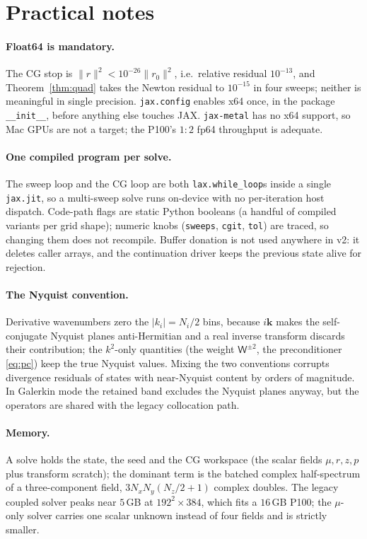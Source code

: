 \documentclass[11pt]{article}
\theoremstyle{definition}
\newcommand{\kk}{\mathbf{k}}
\newcommand{\Wm}{\mathsf{W}}
\begin{document}
\section{Practical notes}\label{sec:practical}

\paragraph{Float64 is mandatory.} The CG stop is
$\|r\|^2<10^{-26}\|r_0\|^2$, i.e.\ relative residual $10^{-13}$, and
Theorem~\ref{thm:quad} takes the Newton residual to $10^{-15}$ in four sweeps;
neither is meaningful in single precision. \texttt{jax.config} enables x64
once, in the package \texttt{\_\_init\_\_}, before anything else touches JAX.
\texttt{jax-metal} has no x64 support, so Mac GPUs are not a target; the P100's
$1{:}2$ fp64 throughput is adequate.

\paragraph{One compiled program per solve.} The sweep loop and the CG loop are
both \texttt{lax.while\_loop}s inside a single \texttt{jax.jit}, so a
multi-sweep solve runs on-device with no per-iteration host dispatch.
Code-path flags are static Python booleans (a handful of compiled variants per
grid shape); numeric knobs (\texttt{sweeps}, \texttt{cgit}, \texttt{tol}) are
traced, so changing them does not recompile. Buffer donation is not used
anywhere in v2: it deletes caller arrays, and the continuation driver keeps
the previous state alive for rejection.

\paragraph{The Nyquist convention.} Derivative wavenumbers zero the
$|k_i|=N_i/2$ bins, because $i\kk$ makes the self-conjugate Nyquist planes
anti-Hermitian and a real inverse transform discards their contribution; the
$k^2$-only quantities (the weight $\Wm^{\pm2}$, the preconditioner
\eqref{eq:pc}) keep the true Nyquist values. Mixing the two conventions
corrupts divergence residuals of states with near-Nyquist content by orders of
magnitude. In Galerkin mode the retained band excludes the Nyquist planes
anyway, but the operators are shared with the legacy collocation path.

\paragraph{Memory.} A solve holds the state, the seed and the CG workspace
(the scalar fields $\mu,r,z,p$ plus transform scratch); the dominant term is
the batched complex half-spectrum of a three-component field,
$3N_xN_y(N_z/2+1)$ complex doubles. The legacy coupled solver peaks near
$5$\,GB at $192^2\times384$, which fits a $16$\,GB P100; the $\mu$-only solver
carries one scalar unknown instead of four fields and is strictly smaller.
\end{document}

